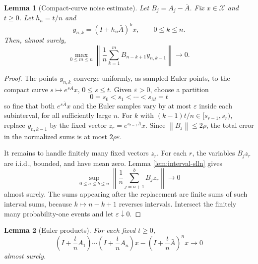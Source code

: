 \documentclass[11pt]{article}
\newtheorem{lemma}{Lemma}
\newcommand{\X}{\mathcal X}
\newcommand{\norm}[1]{\left\lVert #1\right\rVert}
\begin{document}
\begin{lemma}[Compact-curve noise estimate]
\label{lem:curve-slln}
Let \(B_j=A_j-\bar A\).  Fix \(x\in\X\) and \(t\ge0\).  Let \(h_n=t/n\) and
\[
  y_{n,k}=(I+h_n\bar A)^k x,\qquad 0\le k\le n .
\]
Then, almost surely,
\[
  \max_{0\le m\le n}
  \norm{\frac1n\sum_{k=1}^{m} B_{n-k+1}y_{n,k-1}}
  \longrightarrow0 .
\]
\end{lemma}

\begin{proof}
The points \(y_{n,k}\) converge uniformly, as sampled Euler points, to the
compact curve \(s\mapsto e^{s\bar A}x\), \(0\le s\le t\).  Given
\(\varepsilon>0\), choose a partition
\[
  0=s_0<s_1<\cdots<s_M=t
\]
so fine that both \(e^{s\bar A}x\) and the Euler samples vary by at most
\(\varepsilon\) inside each subinterval, for all sufficiently large \(n\).
For \(k\) with \((k-1)t/n\in[s_{r-1},s_r)\), replace \(y_{n,k-1}\) by the
fixed vector \(z_r=e^{s_{r-1}\bar A}x\).  Since
\(\norm{B_j}\le2\rho\), the total error in the normalized sums is at most
\(2\rho\varepsilon\).

It remains to handle finitely many fixed vectors \(z_r\).  For each \(r\), the
variables \(B_jz_r\) are i.i.d., bounded, and have mean zero.  Lemma
\ref{lem:interval-slln} gives
\[
  \sup_{0\le a\le b\le n}
  \norm{\frac1n\sum_{j=a+1}^{b} B_jz_r}\to0
\]
almost surely.  The sums appearing after the replacement are finite sums of
such interval sums, because \(k\mapsto n-k+1\) reverses intervals.  Intersect
the finitely many probability-one events and let \(\varepsilon\downarrow0\).
\end{proof}

\begin{lemma}[Euler products]
\label{lem:euler}
For each fixed \(t\ge0\),
\[
  \left(I+\frac{t}{n}A_1\right)\cdots
  \left(I+\frac{t}{n}A_n\right)x
  -
  \left(I+\frac{t}{n}\bar A\right)^n x
  \longrightarrow0
\]
almost surely.
\end{lemma}
\end{document}
